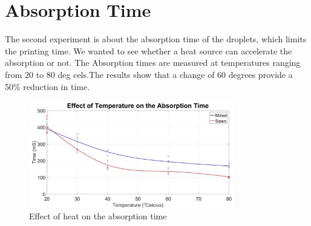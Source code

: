 \section{Absorption Time}
The second experiment is about the absorption time of the droplets, which limits the printing time. We wanted to see whether a heat source can accelerate the absorption or not.
The Absorption times are measured at temperatures ranging from 20 to 80 deg cels.The results show that a change of 60 degrees provide a 50\% reduction in time.

\begin{figure}[h]
	\centering
	\includegraphics[width=0.8\textwidth]{grafiken/AbsorptionTime.jpg}
	\caption{Effect of heat on the absorption time}
	\label{fig:AbsorptionTime}
\end{figure} 

